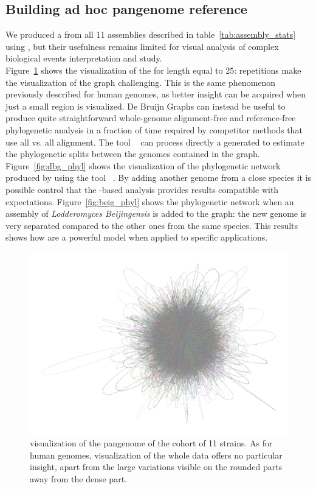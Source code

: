 \subsection{Building ad hoc pangenome reference}
We produced a \dbg from all 11 assemblies described in table~\ref{tab:assembly_stats} using \bifrost, but their usefulness remains limited for visual analysis of complex biological events interpretation and study.\\
Figure~\ref{fig:lodelo_dbg} shows the visualization of the \dbg for \kmer length equal to 25: repetitions make the visualization of the graph challenging. This is the same phenomenon previously described for human genomes, as better insight can be acquired when just a small region is visualized. 
De Bruijn Graphs can instead be useful to produce quite straightforward whole-genome alignment-free and reference-free phylogenetic analysis in a fraction of time required by competitor methods that use all vs. all alignment. The tool \sans~\cite{sans} can process directly a \bifrost generated \ccdbg to estimate the phylogenetic splits between the genomes contained in the graph. Figure~\ref{fig:dbg_phyl} shows the visualization of the phylogenetic network produced by \sans using the tool \splitstree~\cite{splitstree}. By adding another genome from a close species it is possible control that the \dbg-based analysis provides results compatible with expectations. Figure~\ref{fig:beig_phyl} shows the phylogenetic network when an assembly of \emph{Lodderomyces Beijingensis} is added to the graph: the new genome is very separated compared to the other ones from the same species. This results shows how \dbgs are a powerful model when applied to specific applications.\\

\begin{figure}[h]
	\centering
	\includegraphics[width=1\linewidth]{figures/lodelo/lodElo_k25.png}
	\caption{\bandage visualization of the pangenome \dbg of the cohort of 11 \lodelo strains. As for human genomes, visualization of the whole data offers no particular insight, apart from the large variations visible on the rounded parts away from the dense part.}
	\label{fig:lodelo_dbg}
\end{figure}%

